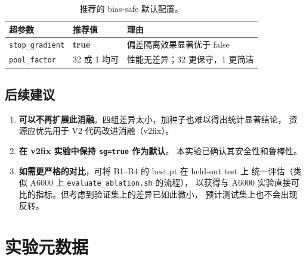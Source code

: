 \documentclass[11pt,a4paper]{ctexart}
\begin{document}
\begin{table}[H]
\centering
\caption{推荐的 bias-safe 默认配置。}
\begin{tabular}{l l l}
\toprule
超参数 & 推荐值 & 理由 \\
\midrule
\texttt{stop\_gradient} & \textbf{true} & 偏差隔离效果显著优于 false \\
\texttt{pool\_factor} & 32 或 1 均可 & 性能无差异；32 更保守，1 更简洁 \\
\bottomrule
\end{tabular}
\end{table}

\subsection{后续建议}

\begin{enumerate}[leftmargin=2em]
  \item \textbf{可以不再扩展此消融}。四组差异太小，加种子也难以得出统计显著结论，
    资源应优先用于 V2 代码改进消融（v2fix）。
  \item \textbf{在 v2fix 实验中保持 \texttt{sg=true} 作为默认}。
    本实验已确认其安全性和鲁棒性。
  \item \textbf{如需更严格的对比}，可将 B1--B4 的 best.pt 在 held-out test 上
    统一评估（类似 A6000 上 \texttt{evaluate\_ablation.sh} 的流程），
    以获得与 A6000 实验直接可比的指标。但考虑到验证集上的差异已如此微小，
    预计测试集上也不会出现反转。
\end{enumerate}

\appendix
\section{实验元数据}
\end{document}
